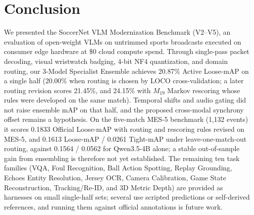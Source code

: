 \documentclass[10pt,twocolumn,letterpaper]{article}
\begin{document}
\section{Conclusion}
\label{sec:conclusion}
We presented the SoccerNet VLM Modernization Benchmark (V2--V5), an evaluation of open-weight VLMs on untrimmed sports broadcasts executed on consumer edge hardware at \$0 cloud compute spend.
Through single-pass packet decoding, visual wristwatch badging, 4-bit NF4 quantization, and domain routing, our 3-Model Specialist Ensemble achieves 20.87\% Active Loose-mAP on a single half (20.00\% when routing is chosen by LOCO cross-validation; a later routing revision scores 21.45\%, and 24.15\% with $M_{19}$ Markov rescoring whose rules were developed on the same match). Temporal shifts and audio gating did not raise ensemble mAP on that half, and the proposed cross-modal synchrony offset remains a hypothesis. On the five-match MES-5 benchmark (1,132 events) it scores 0.1833 Official Loose-mAP with routing and rescoring rules revised on MES-5, and 0.1613 Loose-mAP / 0.0261 Tight-mAP under leave-one-match-out routing, against 0.1564 / 0.0562 for Qwen3.5-4B alone; a stable out-of-sample gain from ensembling is therefore not yet established. The remaining ten task families (VQA, Foul Recognition, Ball Action Spotting, Replay Grounding, Echoes Entity Resolution, Jersey OCR, Camera Calibration, Game State Reconstruction, Tracking/Re-ID, and 3D Metric Depth) are provided as harnesses on small single-half sets; several use scripted predictions or self-derived references, and running them against official annotations is future work.



\end{document}
